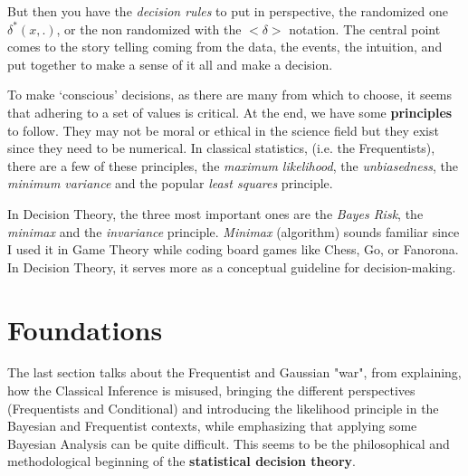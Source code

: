 \documentclass{article} %
\begin{document}
	But then you have the \textit{decision rules} to put in perspective, the randomized one $\delta^*(x,.)$, or the non randomized with the $<\delta>$ notation. The central point comes to the story telling coming from the data, the events, the intuition, and put together to make a sense of it all and make a decision. 

\vspace{.2cm}

To make ‘conscious’ decisions, as there are many from which to choose, it seems that adhering to a set of values is critical. At the end, we have some \textbf{principles} to follow. They may not be moral or ethical in the science field but they exist since they need to be numerical. In classical statistics, (i.e. the Frequentists), there are a few of these principles, the \textit{maximum likelihood}, the \textit{unbiasedness}, the \textit{minimum variance} and the popular \textit{least squares} principle. 

\vspace{.2cm}

In Decision Theory, the three most important ones are the \textit{Bayes Risk}, the \textit{minimax} and the \textit{invariance} principle. \textit{Minimax} (algorithm) sounds familiar since I used it in Game Theory while coding board games like Chess, Go, or Fanorona. In Decision Theory, it serves more as a conceptual guideline for decision-making.

    \section{Foundations} %
    
    The last section talks about the Frequentist and Gaussian "war", from explaining, how the Classical Inference is misused, bringing the different perspectives (Frequentists and Conditional) and introducing the likelihood principle in the Bayesian and Frequentist contexts, while emphasizing that applying some Bayesian Analysis can be quite difficult. This seems to be the philosophical and methodological beginning of the \textbf{statistical decision theory}.
\end{document}
